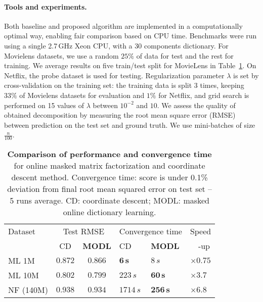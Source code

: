 \documentclass{article}
\begin{document}
\paragraph{Tools and experiments.} Both baseline and proposed algorithm are implemented in a
computationally optimal way, enabling fair comparison based on CPU time. Benchmarks were run using a single 2.7\,GHz Xeon CPU, with
 a 30 components dictionary. For Movielens datasets, we use a random
$25\%$ of data for test and the rest for training. We average results
on five train/test split for MovieLens in Table~\ref{table:rmse}. On Netflix,
the probe dataset is used for testing. Regularization parameter
$\lambda$ is set by cross-validation on the training set: the training
data is split 3 times, keeping $33\%$ of Movielens datasets for evaluation and $1\%$ for
Netflix, and grid search is performed on 15 values of $\lambda$ between $10^{-2}$ and $10$. We assess the
quality of obtained decomposition by measuring the root mean square error
(RMSE) between prediction on the test set and ground truth. We use mini-batches of size $\frac{n}{100}$.

\begin{table}
	\small \centering \caption{\textbf{Comparison of performance and convergence time} for online masked matrix factorization and coordinate descent method.
	Convergence time: score is under 0.1\% deviation from final root mean squared error on test set -- 5 runs average. CD: coordinate descent; MODL: masked online dictionary learning.
	\label{table:rmse}}
	\vspace{.1in}
	\setlength{\tabcolsep}{5pt}\begin{tabular}{lcclll}
		\toprule
		Dataset  & \multicolumn{2}{c}{Test RMSE} & \multicolumn{2}{c}{Convergence time} & Speed\\
		\cmidrule(r){2-3}\cmidrule(r){4-5}
		  & CD     & \textbf{MODL}               & CD      & \textbf{MODL} & ~~-up\\
		\midrule
		ML 1M    & $0.872$ & $\mathbf{0.866}$ & $\mathbf{6\,s}$ & $8\,s$ & $\times0.75$\\
		ML 10M   & $0.802$ & $\mathbf{0.799}$ & $223\,s$        & $\mathbf{60\,s}$ &$\times3.7$\\
		NF (140M) & $0.938$ & $\mathbf{0.934}$ & $1714\,s$       & $\mathbf{256\,s}$ & $\times6.8$ \\
		\bottomrule
	\end{tabular}\vspace{-.2em}
\end{table}
\end{document}
